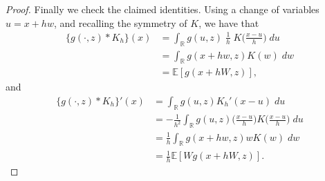 \documentclass[aos]{imsart}
\newcommand{\R}{\mathbb{R}}
\newcommand{\E}{\mathbb{E}}
\begin{document}
\begin{proof}
		Finally we check the claimed identities. Using a change of variables $u=x+hw$, and recalling the symmetry of $K$, we have that
		\begin{align*}
			\{g(\cdot,z)*K_h\}(x) &= \int_{\R} g(u,z) \;\frac1h\; K\bigg(\frac{x-u}{h}\bigg) \; du\\
			&= \int_{\R} g(x+hw,z) K(w) \; dw\\
			&= \E[g(x+hW,z)],
		\end{align*} 
		and
		\begin{align*}
			\{g(\cdot,z)*K_h\}'(x) &= \int_{\R} g(u,z)  K_h'(x-u) \; du\\
			&= -\frac1{h^{2}}\int_{\R} g(u,z) \bigg(\frac{x-u}{h}\bigg) K\bigg(\frac{x-u}{h}\bigg) \; du\\
			&= \frac1h\int_{\R} g(x+hw,z) w K(w) \; dw\\
			&= \frac1h \E[Wg(x+hW,z)].
		\end{align*}
	\end{proof}
	
\end{document}
